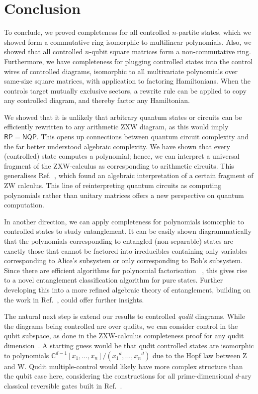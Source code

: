 \section{Conclusion}
To conclude, we proved completeness for all controlled $n$-partite states, which we showed form a commutative ring isomorphic to multilinear polynomials. Also, we showed that all controlled $n$-qubit square matrices form a non-commutative ring. Furthermore, we have completeness for plugging controlled states into the control wires of controlled diagrams, isomorphic to all multivariate polynomials over same-size square matrices, with application to factoring Hamiltonians. When the controls target mutually exclusive sectors, a rewrite rule can be applied to copy any controlled diagram, and thereby factor any Hamiltonian.

We showed that it is unlikely that arbitrary quantum states or circuits can be efficiently rewritten to any arithmetic ZXW diagram, as this would imply $\mathsf{RP} = \mathsf{NQP}$.
This opens up connections between quantum circuit complexity and the far better understood algebraic complexity.
We have shown that every (controlled) state computes a polynomial; hence, we can interpret a universal fragment of the ZXW-calculus as corresponding to arithmetic circuits. This generalises Ref.~\cite{carette2023compositionality}, which found an algebraic interpretation of a certain fragment of ZW calculus.
This line of reinterpreting quantum circuits as computing polynomials rather than unitary matrices offers a new perspective on quantum computation.

In another direction, we can apply completeness for polynomials isomorphic to controlled states to study entanglement. It can be easily shown diagrammatically that the polynomials corresponding to entangled (non-separable) states are exactly those that cannot be factored into irreducibles containing only variables corresponding to Alice's subsystem or only corresponding to Bob's subsystem. Since there are efficient algorithms for polynomial factorisation ~\cite{forbes2015complexity}, this gives rise to a novel entanglement classification algorithm for pure states. Further developing this into a more refined algebraic theory of entanglement, building on the work in Ref.~\cite{Agnew2023Masters}, could offer further insights.

The natural next step is extend our results to controlled \textit{qudit} diagrams.
While the diagrams being controlled are over qudits, we can consider control in the qubit subspace, as done in the ZXW-calculus completeness proof for any qudit dimension~\cite{poor2023completeness}.
A starting guess would be that qudit controlled states are isomorphic to polynomials $\mathbb{C}^{d-1}[x_1,...,x_n]/({x_1}^d,...,{x_n}^d)$ due to the Hopf law between Z and W.
Qudit multiple-control would likely have more complex structure than the qubit case here, considering the constructions for all prime-dimensional $d$-ary classical reversible gates built in Ref.~\cite{Roy2023quditzh}.

